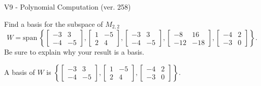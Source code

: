 \begin{exercise}
  \begin{exerciseTitle}V9 - Polynomial Computation (ver. 258)\end{exerciseTitle}
  \begin{exerciseStatement}
    Find a basis for the subspace of \(M_{2,2}\) 
\[W=\mathrm{span}\ \left\{\left[\begin{array}{cc}
-3 & 3 \\
-4 & -5
\end{array}\right] , \left[\begin{array}{cc}
1 & -5 \\
2 & 4
\end{array}\right] , \left[\begin{array}{cc}
-3 & 3 \\
-4 & -5
\end{array}\right] , \left[\begin{array}{cc}
-8 & 16 \\
-12 & -18
\end{array}\right] , \left[\begin{array}{cc}
-4 & 2 \\
-3 & 0
\end{array}\right]\right\}.\]
 Be sure to explain why your result is a basis.


  \end{exerciseStatement}
  \begin{exerciseAnswer}
   A basis of \(W\) is  \(\left\{\left[\begin{array}{cc}
-3 & 3 \\
-4 & -5
\end{array}\right] , \left[\begin{array}{cc}
1 & -5 \\
2 & 4
\end{array}\right] , \left[\begin{array}{cc}
-4 & 2 \\
-3 & 0
\end{array}\right]\right\}\).
  


  \end{exerciseAnswer}
\end{exercise}